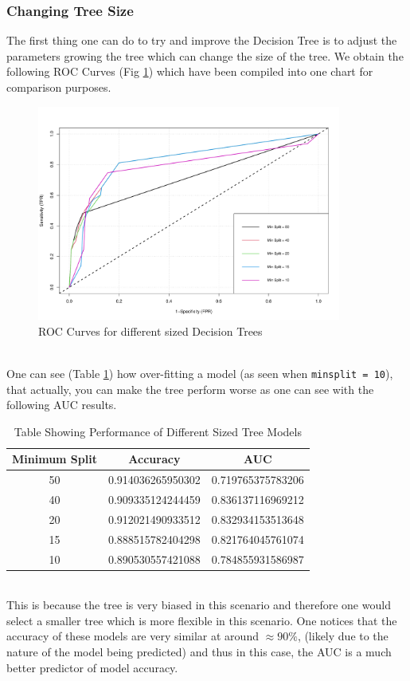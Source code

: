 \documentclass[11pt,a4paper]{report}
\begin{document}
\subsubsection{Changing Tree Size}
The first thing one can do to try and improve the Decision Tree is to adjust the parameters growing the tree which can change the size of the tree.
We obtain the following ROC Curves (Fig \ref{fig:rocall}) which have been compiled into one chart for comparison purposes.
\begin{figure}
    \centering
    \includegraphics[width = 10cm]{reportcharts/roccurveall.pdf}
    \caption{ROC Curves for different sized Decision Trees}
    \label{fig:rocall}
\end{figure}\\
One can see (Table \ref{tab:allaucresults}) how over-fitting a model (as seen when \texttt{minsplit = 10}), that actually, you can make the tree perform worse as one can see with the following AUC results.
\begin{table}
    \centering
    \begin{tabular}{|c|c|c|}
        \hline
        \textbf{Minimum Split} & \textbf{Accuracy} & \textbf{AUC} \\
        \hline
        50 & 0.914036265950302 & 0.719765375783206 \\
        \hline
        40 & 0.909335124244459 & 0.836137116969212 \\
        \hline
        20 & 0.912021490933512 & 0.832934153513648 \\
        \hline
        15 & 0.888515782404298 & 0.821764045761074 \\
        \hline
        10 & 0.890530557421088 & 0.784855931586987 \\
        \hline
    \end{tabular}
    \caption{Table Showing Performance of Different Sized Tree Models}
    \label{tab:allaucresults}
\end{table}\\
This is because the tree is very biased in this scenario and therefore one would select a smaller tree which is more flexible in this scenario.
One notices that the accuracy of these models are very similar at around $\approx 90\%$, (likely due to the nature of the model being predicted) and thus in this case, the AUC is a much better predictor of model accuracy.
\end{document}
